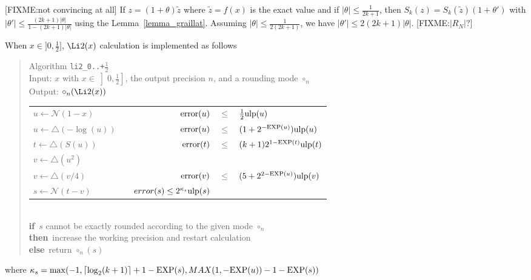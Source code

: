\documentclass[12pt]{amsart}
\def\n{\textnormal}
\def\pinf{\bigtriangleup}
\def\ulp{{\rm ulp}}
\def\Exp{{\rm EXP}}
\def\N{{\mathcal N}}
\def\If{{\bf if}}
\def\then{{\bf then}}
\def\Else{{\bf else}}
\begin{document}
[FIXME:not convincing at all]
If $z = (1+\theta) \tilde{z}$ where $\tilde{z} = f(x)$ is the exact value and
if $|\theta| \leq \frac{1}{2k+1}$, then $S_k(z) = S_k(\tilde{z})(1+\theta')$
with $|\theta'| \leq \frac{(2k+1)|\theta|}{1-(2k+1)|\theta|}$ using the 
Lemma~\ref{lemma_graillat}.
Assuming $|\theta| \leq \frac{1}{2(2k+1)}$, we have 
$|\theta'| \leq 2(2k+1)|\theta|$.
[FIXME:$|R_N|$?]



When $x \in ]0, \frac{1}{2}]$, $\Li2(x)$ calculation is implemented as follows
\begin{quote}
Algorithm {\tt li2\_0..+$\frac{1}{2}$}\\
Input: $x$ with $x \in \left]0, \frac{1}{2}\right]$, the output precision
$n$, and a rounding mode $\circ_n$ \\
Output: $\circ_n(\Li2(x))$ \\
\begin{tabular}{l c r c l}
$u \leftarrow \N(1-x)$ & &
$\n{error}(u) $ & $ \leq $ & $ \frac{1}{2} \ulp(u)$\\
$u \leftarrow \pinf(-\log(u))$ & &
$\n{error}(u) $ & $ \leq $ & $ (1 + 2^{-\Exp(u)}) \ulp(u)$\\
$t \leftarrow \pinf(S(u))$ & &
$\n{error}(t) $ & $ \leq $ & $ (k+1) 2^{1-\Exp(t)} \ulp(t)$\\
$v \leftarrow \pinf(u^2)$\\
$v \leftarrow \pinf(v / 4)$ & &
$\n{error}(v) $ & $ \leq $ & $ (5 + 2^{2-\Exp(u)}) \ulp(v)$\\
$s \leftarrow \N(t - v)$ & & $error(s) \leq 2^{\kappa_s} \ulp(s)$\\
\end{tabular}\\
\If\ $s$ cannot be exactly rounded according to the given mode $\circ_n$\\
\then\ increase the working precision and restart calculation\\
\Else\ return $\circ_n(s)$
\end{quote}
where $\kappa_s ={\rm max}(-1, \lceil\log_2(k+1)\rceil + 1 - \Exp(s),
MAX(1, -\Exp(u)) -1 - \Exp(s))$
\end{document}
